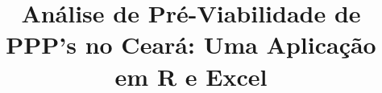\documentclass{lib/ofb}
\title{Análise de Pré-Viabilidade de PPP's no Ceará: Uma Aplicação em R e Excel}
\begin{document}
    \imprimircapa
    \imprimirfolhaderosto
    \imprimircontracapa
    \imprimirresumo
    \imprimirsumario
    
    
    
    
    
    
    
\end{document}
